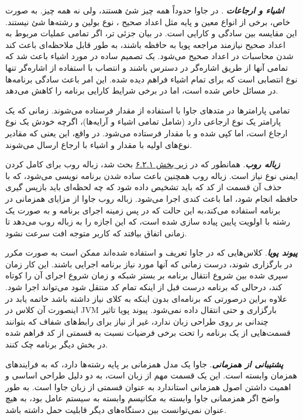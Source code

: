 \documentclass[a4paper,12pt]{report}
\begin{document}
	\textbf{\textit{
	اشیاء و ارجاعات
}}. در جاوا حدوداً همه چیز شئ هستند، ولی نه همه چیز. به صورت خاص، برخی از انواع معین و پایه مثل اعداد صحیح
، نوع بولین
 و رشته‌ها شئ نیستند. این مقایسه بین سادگی و کارایی است. در بیان جزئی تر، اگر تمامی عملیات مربوط به اعداد صحیح نیازمند مراجعه پویا به حافظه باشند، به طور قابل ملاحظه‌ای باعث کند شدن محاسبات در اعداد صحیح می‌شود. یک تصمیم ساده در مورد اشیاء باعث شد که تمامی آنها از طریق اشاره‌گر در دسترس باشند و انتصاب با استفاده از اشاره‌گر تنها نوع انتصابی است که برای تمام اشیاء فراهم دیده شده. این امر باعث سادگی برنامه‌ها در مسائل خاص شده است، اما در برخی شرایط کارایی برنامه را کاهش می‌دهد.

تمامی پارامترها در متدهای جاوا با استفاده از مقدار فرستاده می‌شوند. زمانی که یک پارامتر یک نوع ارجاعی دارد (شامل تمامی اشیاء و آرایه‌ها)، اگرچه خودش یک نوع ارجاع است، اما کپی شده و با مقدار فرستاده می‌شود. در واقع، این یعنی که مقادیر نوع‌های اولیه با مقدار و اشیاء با ارجاع ارسال می‌شوند.
	
	
	\textbf{\textit{
	زباله روب}}. همانطور که در 
	\hyperref[subsec1:sec2:chap6]{
	زیر بخش ۶.۲.۱} بحث شد، زباله روب برای کامل کردن ایمنی نوع  نیاز است. زباله روب همچنین باعث ساده شدن برنامه نویسی می‌شود، که با حذف آن قسمت از کد که باید تشخیص داده شود که چه لحظه‌ای باید بازپس گیری حافظه انجام شود، اما باعث کندی اجرا می‌شود. 
	زباله روب جاوا از مزایای همزمانی در برنامه استفاده می‌کند،‌به این حالت که در پس زمینه اجرای برنامه و به صورت یک رشته با اولویت پایین پیاده سازی شده است، که این اجازه را به زباله روب می‌دهد تا زمانی اتفاق بیافتد که کاربر متوجه افت سرعت نشود.
	
	\textbf{\textit{
	پیوند پویا}}. 
	کلاس‌هایی که در جاوا تعریف و استفاده شده‌اند ممکن است به صورت مکرر در 
	بارگزاری شوند،‌ درست زمانی که آنها مورد نیاز برنامه اجرایی باشند. این کار زمان سپری شده بین شروع انتقال برنامه بر بستر شبکه و زمان شروع اجرای آن را کوتاه کند،‌ درحالی که برنامه درست قبل از اینکه تمام کد منتقل شود می‌تواند اجرا شود. علاوه براین درصورتی که برنامه‌ای بدون اینکه به کلای نیاز داشته باشد خاتمه یابد در اینصورت آن کلاس در JVM بارگزاری و حتی انتقال داده نمی‌شود. پیوند پویا تاثیر چندانی بر روی طراحی زبان ندارد، غیر از نیاز برای رابط‌های شفاف که بتوانند قسمت‌هایی از یک برنامه را تحت برخی فرضیات نسبت به قسمتی از کد فراهم شده در بخش دیگر برنامه چک کنند.
	
	
	\textbf{\textit{
	پشتیبانی از همزمانی}}. جاوا یک مدل همزمانی بر پایه رشته‌ها
 دارد، که به فرایندهای همزمان وابسته است. این یک قسمت مهم از زبان است، به دو دلیل طراحی اساسی و اهمیت داشتن اصول همزمانی استاندارد به عنوان قسمتی از زبان جاوا است. به طور واضح اگر همزممانی جاوا وابسته به مکانیسم وابسته به سیستم عامل بود، به هیچ عنوان نمی‌توانست بین دستگاه‌های دیگر قابلیت حمل داشته باشد.
 
\end{document}
